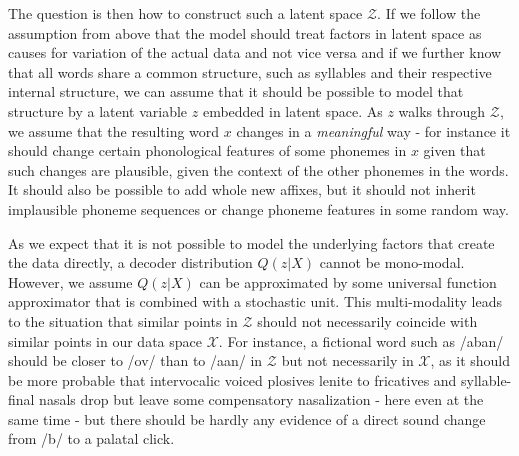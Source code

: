 \documentclass[6pt]{article}
\begin{document}
The question is then how to construct such a latent space $\mathcal{Z}$. If we follow the assumption from above that the model should treat factors in latent space as causes for variation of the actual data and not vice versa and if we further know that all words share a common structure, such as syllables and their respective internal structure, we can assume that it should be possible to model that structure by a latent variable $z$ embedded in latent space. As $z$ walks through $\mathcal{Z}$, we assume that the resulting word $x$ changes in a \textit{meaningful} way - for instance it should change certain phonological features of some phonemes in $x$ given that such changes are plausible, given the context of the other phonemes in the words. It should also be possible to add whole new affixes, but it should not inherit implausible phoneme sequences or change phoneme features in some random way. 


As we expect that it is not possible to model the underlying factors that create the data directly, a decoder distribution $Q(z|X)$ cannot be mono-modal. However, we assume $Q(z|X)$ can be approximated by some universal function approximator that is combined with a stochastic unit. This multi-modality leads to the situation that similar points in $\mathcal{Z}$ should not necessarily coincide with similar points in our data space $\mathcal{X}$. For instance, a fictional word such as /aban/ should be closer to /ov/ than to /a\textipa{\textdoublebarpipe}an/ in $\mathcal{Z}$ but not necessarily in $\mathcal{X}$, as it should be more probable that intervocalic voiced plosives lenite to fricatives and syllable-final nasals drop but leave some compensatory nasalization - here even at the same time - but there should be hardly any evidence of a direct sound change from /b/ to a palatal click.

\end{document}

